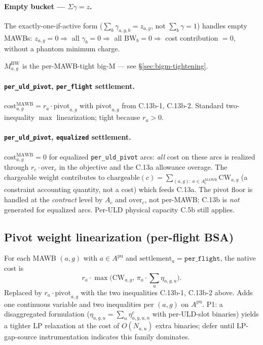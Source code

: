 \documentclass[11pt,a4paper]{article}
\theoremstyle{definition}
\begin{document}
\paragraph{Empty bucket --- $\Sigma \gamma = z$.}
The exactly-one-if-active form ($\sum_b \gamma_{a,g,b} = z_{a,g}$, not
$\sum_b \gamma = 1$) handles empty MAWBs: $z_{a,g} = 0 \Rightarrow$ all
$\gamma_b = 0 \Rightarrow$ all $\text{BW}_b = 0 \Rightarrow$ cost contribution
$= 0$, without a phantom minimum charge.

$M^{\text{BW}}_{a,g}$ is the per-MAWB-tight big-M --- see
\S\ref{sec:bigm-tightening}.

\paragraph{\texttt{per\_uld\_pivot}, \texttt{per\_flight} settlement.}
$\text{cost}^{\text{MAWB}}_{a,g} = r_a \cdot \text{pivot}_{a,g}$ with
$\text{pivot}_{a,g}$ from C.13b-1, C.13b-2. Standard two-inequality $\max$
linearization; tight because $r_a > 0$.

\paragraph{\texttt{per\_uld\_pivot}, \texttt{equalized} settlement.}
$\text{cost}^{\text{MAWB}}_{a,g} = 0$ for equalized \texttt{per\_uld\_pivot}
arcs: \emph{all} cost on these arcs is realized through $r_c \cdot
\text{over}_c$ in the objective and the C.13a allowance overage. The
chargeable weight contributes to $\text{chargeable}(c) = \sum_{(a,g):\, a \in
A_c^{\text{MAWB}}} \text{CW}_{a,g}$ (a constraint accounting quantity, not a
cost) which feeds C.13a. The pivot floor is handled at the \emph{contract}
level by $A_c$ and $\text{over}_c$, not per-MAWB; C.13b is \emph{not}
generated for equalized arcs. Per-ULD physical capacity C.5b still applies.

\subsection{Pivot weight linearization (per-flight BSA)}
\label{sec:lin-pivot}

For each MAWB $(a, g)$ with $a \in A^{\text{pu}}$ and $\text{settlement}_a =
\texttt{per\_flight}$, the native cost is
\[
  r_a \cdot \max\bigl(\text{CW}_{a,g},\, \pi_a \cdot \sum_u \eta_{a,g,u}\bigr).
\]
Replaced by $r_a \cdot \text{pivot}_{a,g}$ with the two inequalities C.13b-1,
C.13b-2 above. Adds one continuous variable and two inequalities per
$(a, g)$ on $A^{\text{pu}}$. P1: a disaggregated formulation
($\eta_{a,g,u} = \sum_n \eta^c_{a,g,u,n}$ with per-ULD-slot binaries) yields
a tighter LP relaxation at the cost of $O(N_{a,u})$ extra binaries; defer
until LP-gap-source instrumentation indicates this family dominates.
\end{document}
